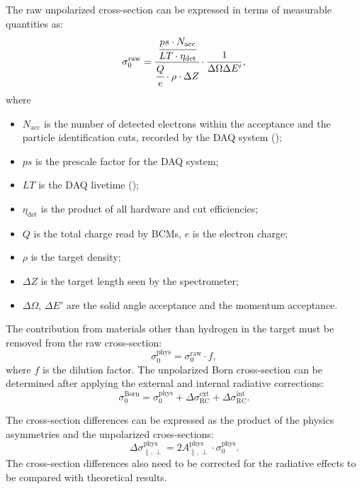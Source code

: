 The raw unpolarized cross-section can be expressed in terms of measurable quantities as:
\begin{equation} \label{C7S1E4}
\sigma_0^{\mathrm{raw}} = \cfrac{\cfrac{ps\cdot N_{\mathrm{acc}}}{LT\cdot\eta_{\mathrm{det}}}}{\cfrac{Q}{e}\cdot\rho\cdot\Delta Z }\cdot\frac{1}{\Delta\Omega\Delta E'},
\end{equation}
where
\begin{itemize}[parsep=0pt]
\item $N_{\mathrm{acc}}$ is the number of detected electrons within the acceptance and the particle identification cuts, recorded by the DAQ system ();
\item $ps$ is the prescale factor for the DAQ system;
\item $LT$ is the DAQ livetime ();
\item $\eta_{\mathrm{det}}$ is the product of all hardware and cut efficiencies;
\item $Q$ is the total charge read by BCMs, $e$ is the electron charge;
\item $\rho$ is the target density;
\item $\Delta Z$ is the target length seen by the spectrometer;
\item $\Delta\Omega$, $\Delta E'$ are the solid angle acceptance and the momentum acceptance.
\end{itemize}

The contribution from materials other than hydrogen in the target must be removed from the raw cross-section:
\begin{equation} \label{C7S1E5}
\sigma_0^{\mathrm{phys}} = \sigma_0^{\mathrm{raw}}\cdot f,
\end{equation}
where $f$ is the dilution factor. The unpolarized Born cross-section can be determined after applying the external and internal radiative corrections:
\begin{equation} \label{C7S1E6}
\sigma_0^{\mathrm{Born}} = \sigma_0^{\mathrm{phys}}+\Delta \sigma_{\mathrm{RC}}^{\mathrm{ext}}+\Delta \sigma_{\mathrm{RC}}^{\mathrm{int}}.
\end{equation}

The cross-section differences can be expressed as the product of the physics asymmetries and the unpolarized cross-sections:
\begin{equation} \label{C7S1E7}
\Delta\sigma_{\parallel,\perp}^{\mathrm{phys}} = 2A_{\parallel,\perp}^{\mathrm{phys}}\cdot\sigma_0^{\mathrm{phys}}.
\end{equation}
The cross-section differences also need to be corrected for the radiative effects to be compared with theoretical results.

